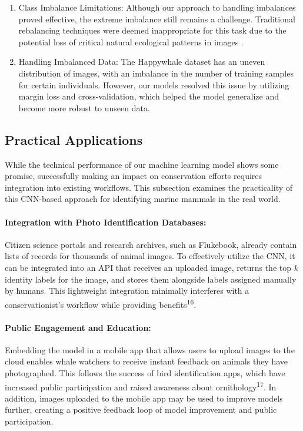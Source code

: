 \documentclass[twocolumn]{article}
\begin{document}
\begin{enumerate}
    \item Class Imbalance Limitations: Although our approach to handling imbalances proved effective, the extreme imbalance still remains a challenge. Traditional rebalancing techniques were deemed inappropriate for this task due to the potential loss of critical natural ecological patterns in images . 
    \item Handling Imbalanced Data: The Happywhale dataset has an uneven distribution of images, with an imbalance in the number of training samples for certain individuals. However, our models resolved this issue by utilizing margin loss and cross-validation, which helped the model generalize and become more robust to unseen data.
\end{enumerate}

\subsection{Practical Applications}

While the technical performance of our machine learning model shows some promise, successfully making an impact on conservation efforts requires integration into existing workflows. This subsection examines the practicality of this CNN-based approach for identifying marine mammals in the real world.

\paragraph{Integration with Photo Identification Databases:}

Citizen science portals and research archives, such as Flukebook, already contain lists of records for thousands of animal images. To effectively utilize the CNN, it can be integrated into an API that receives an uploaded image, returns the top $k$ identity labels for the image, and stores them alongside labels assigned manually by humans. This lightweight integration minimally interferes with a conservationist's workflow while providing benefits\textsuperscript{16}.

\paragraph{Public Engagement and Education:}

Embedding the model in a mobile app that allows users to upload images to the cloud enables whale watchers to receive instant feedback on animals they have photographed. This follows the success of bird identification apps, which have increased public participation and raised awareness about ornithology\textsuperscript{17}.  In addition, images uploaded to the mobile app may be used to improve models further, creating a positive feedback loop of model improvement and public participation.
\end{document}
